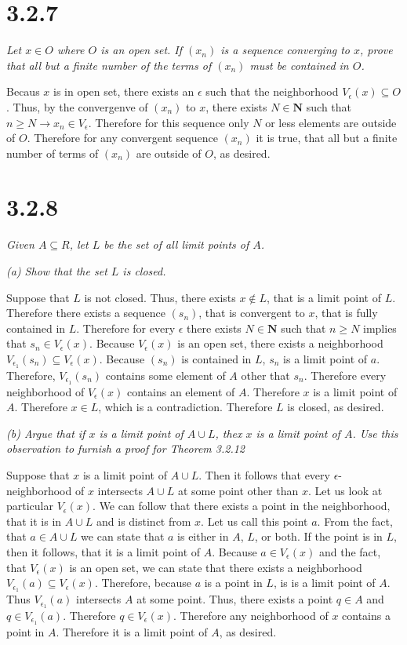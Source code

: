\documentclass[11pt,oneside,titlepage]{article}
\begin{document}
\section*{3.2.7}
\textit{Let $x \in O$ where $O$ is an open set. If $(x_n)$ is a sequence
  converging to $x$, prove that all but a finite number of the terms of
  $(x_n)$ must be contained in $O$. }

Becaus $x$ is in open set, there exists an $\epsilon$ such that the neighborhood $V_\epsilon (x) \subseteq O$. Thus, by the convergenve of $(x_n)$ to $x$,
there
exists $N \in \textbf{N}$ such that $n \geq N \to x_n \in V_\epsilon$.
Therefore for this sequence only $N$ or less elements are outside of $O$.
Therefore for any convergent sequence $(x_n)$ it is true, that all but a finite
number of terms of $(x_n)$ are outside of $O$, as desired.

\section*{3.2.8}
\textit{Given $A \subseteq R$, let $L$ be the set of all limit points of
  $A$.}

\textit{(a) Show that the set $L$ is closed.}

Suppose that $L$ is not closed. Thus, there exists $x \notin L$, that is a
limit point of $L$. Therefore there exists a sequence $(s_n)$, that is
convergent to $x$, that is fully contained in $L$. Therefore for
every $\epsilon$ there exists $N \in \textbf{N}$ such that $n \geq N$ implies
that $s_n \in  V_\epsilon(x)$. Because $V_\epsilon(x)$ is an open set, there
exists a neighborhood $V_{\epsilon_1}(s_n) \subseteq V_\epsilon(x)$.
Because $(s_n)$ is contained in $L$, $s_n$ is a limit point of $a$. Therefore,
$V_{\epsilon_1}(s_n)$ contains some element of $A$ other that $s_n$.
Therefore every neighborhood of $V_\epsilon(x)$ contains an element of $A$.
Therefore $x$ is a limit point of $A$. Therefore $x \in L$, which is a
contradiction. Therefore $L$ is closed, as desired.

\textit{(b) Argue that if $x$ is a limit point of $A \cup L$, thex $x$ is a
  limit point of $A$. Use this observation to furnish a proof for
  Theorem 3.2.12}

Suppose that $x$ is a limit point of $A \cup L$. Then it follows that every
$\epsilon$-neighborhood of $x$ intersects $A \cup L$ at some point other than $x$. Let us look at particular  $V_\epsilon(x)$.
We can follow that there exists a point in the neighborhood,
that it is in $A \cup L$ and  is distinct from $x$. Let us call this point  $a$.
From the fact, that $a \in A \cup L$ we can state that $a$ is either in $A$,
$L$, or both.
If the point is in $L$, then it follows, that it is a limit point of $A$.
Because $a \in V_\epsilon(x)$ and the fact, that $V_\epsilon(x)$ is an open set,
we can state that there exists a neighborhood
$V_{\epsilon_1}(a) \subseteq V_\epsilon(x)$. Therefore, because $a$ is a point
in $L$, is is a limit point of $A$. Thus $V_{\epsilon_1}(a)$ intersects $A$ at
some point. Thus, there exists a point $q \in A$ and $q \in V_{\epsilon_1}(a)$.
Therefore $q \in V_\epsilon(x)$. Therefore any neighborhood of $x$ contains a
point in $A$. Therefore it is a limit point of $A$, as desired.
\end{document}
